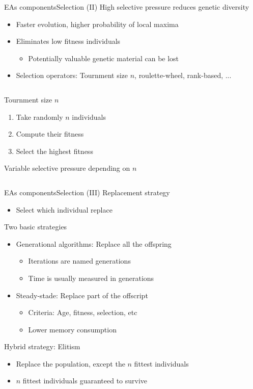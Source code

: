 \documentclass[10pt,compress]{beamer} %
\begin{document}
\begin{frame}{EAs components}{Selection (II)} 
	High selective pressure reduces \alert{genetic diversity}
	\begin{itemize}
		\item Faster evolution, higher probability of local maxima
		\item Eliminates low fitness individuals
		\begin{itemize}
			\item Potentially valuable genetic material can be lost
		\end{itemize}
		\item Selection operators: Tournment size $n$, roulette-wheel, rank-based, ...
	\end{itemize}
	
    \begin{columns}
	\begin{block}{Tournment size $n$}
	\begin{enumerate}
		\item Take randomly $n$ individuals
		\item Compute their fitness
		\item Select the highest fitness
	\end{enumerate}
	Variable selective pressure depending on $n$
    \end{block}
    \end{columns}
\end{frame}

\begin{frame}{EAs components}{Selection (III)} 
	Replacement strategy
	\begin{itemize}
		\item Select which individual replace
	\end{itemize}
	
	Two basic strategies
	\begin{itemize}
		\item Generational algorithms: Replace all the offspring
		\begin{itemize}
			\item Iterations are named \alert{generations}
			\item Time is usually measured in generations
		\end{itemize}
		\item Steady-stade: Replace part of the offscript
		\begin{itemize}
			\item Criteria: Age, fitness, selection, etc
			\item Lower memory consumption
		\end{itemize}
	\end{itemize}
	Hybrid strategy: \alert{Elitism}
		\begin{itemize}
			\item Replace the population, except the $n$ fittest individuals
			\item $n$ fittest individuals guaranteed to survive
		\end{itemize}
\end{frame}
\end{document}
